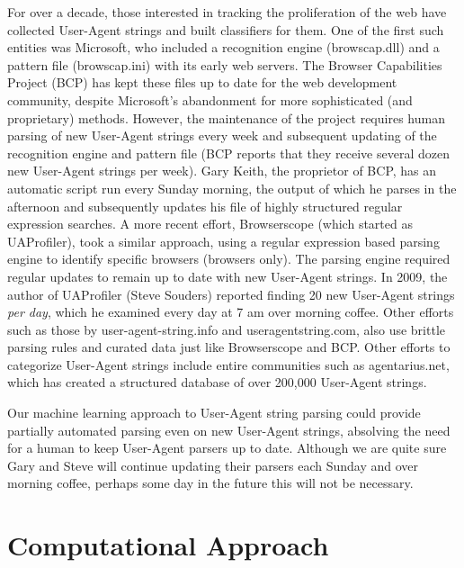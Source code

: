 \documentclass[10pt]{article}
\begin{document}
\begin{multicols}{2}
For over a decade, those interested in tracking the proliferation of the web have collected User-Agent strings and built classifiers for them.  One of the first such entities was Microsoft, who included a recognition engine (browscap.dll) and a pattern file (browscap.ini) with its early web servers.\cite{bcp}  The Browser Capabilities Project (BCP) has kept these files up to date for the web development community, despite Microsoft's abandonment for more sophisticated (and proprietary) methods.\cite{bcp}  However, the maintenance of the project requires human parsing of new User-Agent strings every week and subsequent updating of the recognition engine and pattern file (BCP reports that they receive several dozen new User-Agent strings per week).  Gary Keith, the proprietor of BCP, has an automatic script run every Sunday morning, the output of which he parses in the afternoon and subsequently updates his file of highly structured regular expression searches.  A more recent effort, Browserscope (which started as UAProfiler), took a similar approach, using a regular expression based parsing engine to identify specific browsers (browsers only). \cite{souders}  The parsing engine required regular updates to remain up to date with new User-Agent strings.  In 2009, the author of UAProfiler (Steve Souders) reported finding 20 new User-Agent strings {\it per day}, which he examined every day at 7 am over morning coffee. \cite{souders2}  Other efforts such as those by user-agent-string.info and useragentstring.com, also use brittle parsing rules and curated data just like Browserscope and BCP.  \cite{uas.info,uas.com}  Other efforts to categorize User-Agent strings include entire communities such as agentarius.net, which has created a structured database of over 200,000 User-Agent strings.   

Our machine learning approach to User-Agent string parsing could provide partially automated parsing even on new User-Agent strings, absolving the need for a human to keep User-Agent parsers up to date.  Although we are quite sure Gary and Steve will continue updating their parsers each Sunday and over morning coffee, perhaps some day in the future this will not be necessary.

\section{Computational Approach}

\end{multicols}
\end{document}
